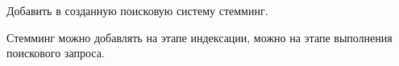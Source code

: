 
Добавить в созданную поисковую систему стемминг.

Стемминг можно добавлять на этапе индексации, можно на этапе выполнения поискового запроса.

\pagebreak
